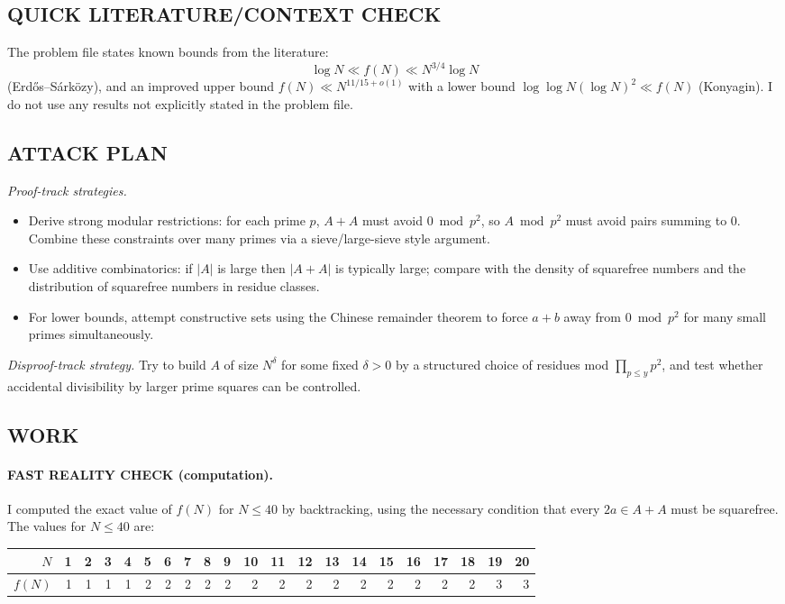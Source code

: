 \subsection*{QUICK LITERATURE/CONTEXT CHECK}
The problem file states known bounds from the literature:
\[\log N \ll f(N) \ll N^{3/4}\log N\]
(Erd\H{o}s--S\'ark\"ozy), and an improved upper bound $f(N)\ll N^{11/15+o(1)}$ with a lower bound $\log\log N (\log N)^2\ll f(N)$ (Konyagin).
I do not use any results not explicitly stated in the problem file.

\subsection*{ATTACK PLAN}
\emph{Proof-track strategies.}
\begin{itemize}
\item Derive strong modular restrictions: for each prime $p$, $A+A$ must avoid $0\bmod p^2$, so $A\bmod p^2$ must avoid pairs summing to $0$. Combine these constraints over many primes via a sieve/large-sieve style argument.
\item Use additive combinatorics: if $|A|$ is large then $|A+A|$ is typically large; compare with the density of squarefree numbers and the distribution of squarefree numbers in residue classes.
\item For lower bounds, attempt constructive sets using the Chinese remainder theorem to force $a+b$ away from $0\bmod p^2$ for many small primes simultaneously.
\end{itemize}

\emph{Disproof-track strategy.}
Try to build $A$ of size $N^{\delta}$ for some fixed $\delta>0$ by a structured choice of residues mod $\prod_{p\le y} p^2$, and test whether accidental divisibility by larger prime squares can be controlled.

\subsection*{WORK}
\paragraph{FAST REALITY CHECK (computation).}
I computed the exact value of $f(N)$ for $N\le 40$ by backtracking, using the necessary condition that every $2a\in A+A$ must be squarefree.
The values for $N\le 40$ are:

\begin{center}
\begin{tabular}{r|rrrrrrrrrrrrrrrrrrrr}
$N$ &1&2&3&4&5&6&7&8&9&10&11&12&13&14&15&16&17&18&19&20\\\hline
$f(N)$&1&1&1&1&2&2&2&2&2&2&2&2&2&2&2&2&2&2&3&3
\end{tabular}
\end{center}

